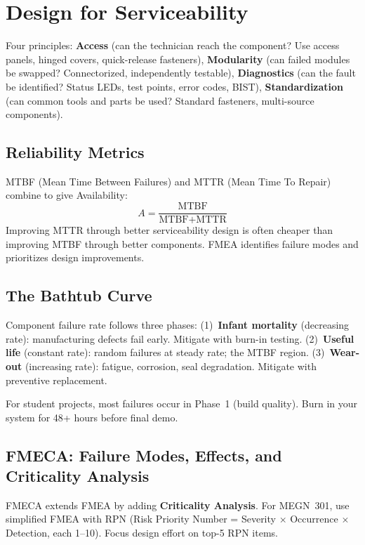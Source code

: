 \section{Design for Serviceability}
Four principles: \textbf{Access} (can the technician reach the component? Use access panels, hinged covers, quick-release fasteners), \textbf{Modularity} (can failed modules be swapped? Connectorized, independently testable), \textbf{Diagnostics} (can the fault be identified? Status LEDs, test points, error codes, BIST), \textbf{Standardization} (can common tools and parts be used? Standard fasteners, multi-source components).

\subsection{Reliability Metrics}
MTBF (Mean Time Between Failures) and MTTR (Mean Time To Repair) combine to give Availability:
\[
A = \frac{\text{MTBF}}{\text{MTBF} + \text{MTTR}}
\]
Improving MTTR through better serviceability design is often cheaper than improving MTBF through better components. FMEA identifies failure modes and prioritizes design improvements.


\subsection{The Bathtub Curve}
Component failure rate follows three phases: (1)~\textbf{Infant mortality} (decreasing rate): manufacturing defects fail early. Mitigate with burn-in testing. (2)~\textbf{Useful life} (constant rate): random failures at steady rate; the MTBF region. (3)~\textbf{Wear-out} (increasing rate): fatigue, corrosion, seal degradation. Mitigate with preventive replacement.

For student projects, most failures occur in Phase~1 (build quality). Burn in your system for 48+ hours before final demo.

\subsection{FMECA: Failure Modes, Effects, and Criticality Analysis}
FMECA extends FMEA by adding \textbf{Criticality Analysis}. For MEGN~301, use simplified FMEA with RPN (Risk Priority Number = Severity $\times$ Occurrence $\times$ Detection, each 1--10). Focus design effort on top-5 RPN items.

